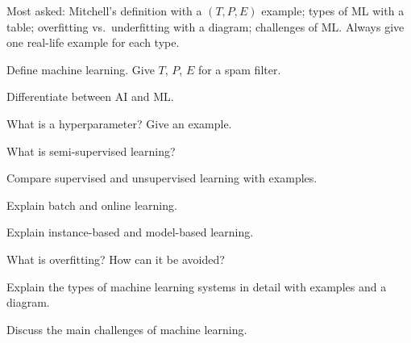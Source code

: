 \begin{imp}
Most asked: Mitchell's definition with a $(T,P,E)$ example; types of ML with a table; overfitting vs.\ underfitting with a diagram; challenges of ML. Always give one real-life example for each type.
\end{imp}

\begin{iq}
\item \twom Define machine learning. Give $T$, $P$, $E$ for a spam filter.
\item \twom Differentiate between AI and ML.
\item \twom What is a hyperparameter? Give an example.
\item \twom What is semi-supervised learning?
\item \fivem Compare supervised and unsupervised learning with examples.
\item \fivem Explain batch and online learning.
\item \fivem Explain instance-based and model-based learning.
\item \fivem What is overfitting? How can it be avoided?
\item \tenm Explain the types of machine learning systems in detail with examples and a diagram.
\item \tenm Discuss the main challenges of machine learning.
\end{iq}
